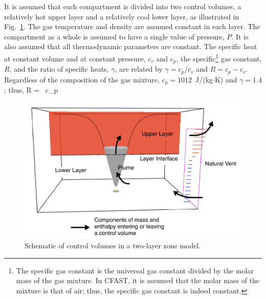 \documentclass[12pt]{book}
\begin{document}
It is assumed that each compartment is divided into two control volumes, a relatively hot upper layer and a relatively cool lower layer, as illustrated in Fig.~\ref{fig:Control_Volumes}. The gas temperature and density are assumed constant in each layer. The compartment as a whole is assumed to have a single value of pressure, $P$. It is also assumed that all thermodynamic parameters are constant. The specific heat at constant volume and at constant pressure, $c_v$ and $c_p$, the specific\footnote{The specific gas constant is the universal gas constant divided by the molar mass of the gas mixture. In CFAST, it is assumed that the molar mass of the mixture is that of air; thus, the specific gas constant is indeed constant.} gas constant, $R$, and the ratio of specific heats, $\gamma$, are related by $\gamma = c_p / c_v$ and $R = c_p- c_v$. Regardless of the composition of the gas mixture, $c_p = 1012$~J/(kg$\cdot$K) and $\gamma = 1.4$; thus,
\be
   R =  \, c_p  \; 
\ee
\begin{figure}[h]
\centering
\includegraphics[width=\textwidth]{FIGURES/Control_Volumes}
\caption{Schematic of control volumes in a two-layer zone model.}
 \label{fig:Control_Volumes}
\end{figure}
\end{document}
